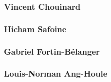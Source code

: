 \documentclass[10pt,a4paper,final]{article}
\begin{document}
\begin{spacing}{1.5}
\subsubsection{Vincent Chouinard}

\subsubsection{Hicham Safoine}

\subsubsection{Gabriel Fortin-Bélanger}

\subsubsection{Louis-Norman Ang-Houle}
\end{spacing}



\end{document}
